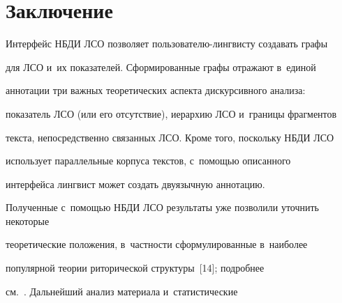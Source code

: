 




\section{Заключение }





  Интерфейс НБДИ ЛСО позволяет пользователю-лингвисту создавать графы 


для ЛСО и~их показателей. Сформированные графы отражают в~единой 


аннотации три важных теоретических аспекта дискурсивного анализа: 


показатель ЛСО (или его отсутствие), иерархию ЛСО и~границы фрагментов 


текста, непосредственно связанных ЛСО. Кроме того, поскольку НБДИ ЛСО 


использует параллельные корпуса текстов, с~по\-мощью описанного 


интерфейса лингвист может создать двуязычную аннотацию. 


Полученные с~по\-мощью НБДИ ЛСО результаты уже позволили уточнить некоторые 


тео\-ре\-ти\-че\-ские положения, в~част\-ности сформулированные в~наиболее 


популярной тео\-рии риторической структуры~[14]; подробнее  


см.~\cite{9-in, 10-in}. Дальнейший анализ материала и~статистические 



